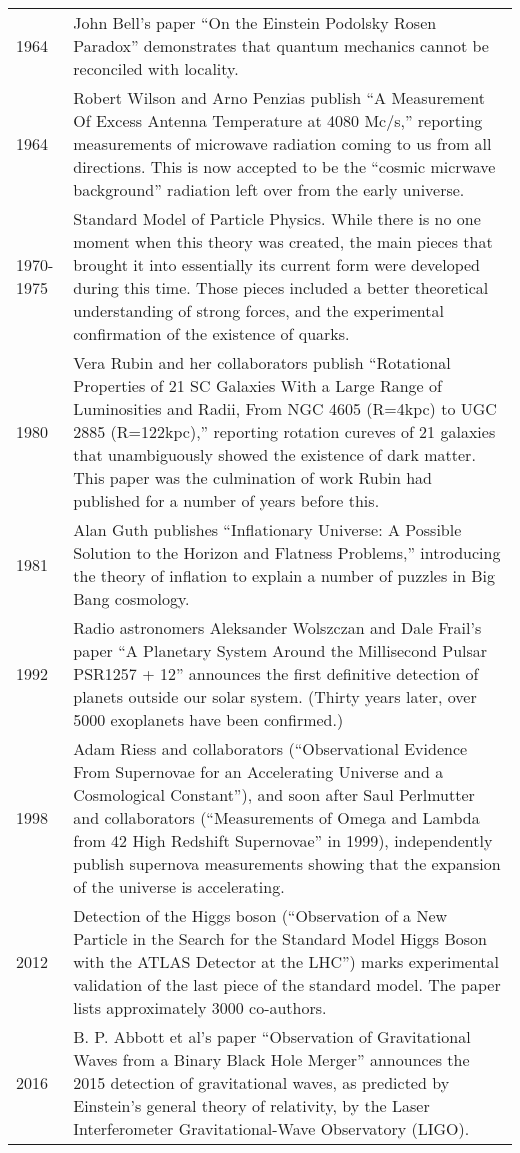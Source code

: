 \documentclass[../main.tex]{subfiles}
\begin{document}
\begin{center}
\begin{longtable}{p{}  p{}}
1964&John Bell's paper “On the Einstein Podolsky Rosen Paradox” demonstrates that quantum mechanics cannot be reconciled with locality.\\
1964&Robert Wilson and Arno Penzias publish “A Measurement Of Excess Antenna Temperature at 4080 Mc/s,” reporting measurements of microwave radiation coming to us from all directions. This is now accepted to be the “cosmic micrwave background” radiation left over from the early universe.\\
1970-1975&Standard Model of Particle Physics. While there is no one moment when this theory was created, the main pieces that brought it into essentially its current form were developed during this time. Those pieces included a better theoretical understanding of strong forces, and the experimental confirmation of the existence of quarks.\\
1980&Vera Rubin and her collaborators publish “Rotational Properties of 21 SC Galaxies With a Large Range of Luminosities and Radii, From NGC
4605 (R=4kpc) to UGC 2885 (R=122kpc),” reporting rotation cureves of 21 galaxies that unambiguously showed the existence of dark matter. This paper was the culmination of work Rubin had published for a number of years before this.\\
1981&Alan Guth publishes “Inflationary Universe: A Possible Solution to the Horizon and Flatness Problems,” introducing the theory of inflation to explain a number of puzzles in Big Bang cosmology.\\
1992&Radio astronomers Aleksander Wolszczan and Dale Frail's paper “A Planetary System Around the Millisecond Pulsar PSR1257 + 12” announces the first definitive detection of planets outside our solar system. (Thirty years later, over 5000 exoplanets have been confirmed.) \\
1998&Adam Riess and collaborators (“Observational Evidence From Supernovae for an Accelerating Universe and a Cosmological Constant”), and soon after Saul Perlmutter and collaborators (“Measurements of Omega
and Lambda from 42 High Redshift Supernovae” in 1999), independently publish supernova measurements showing that the expansion of the universe is accelerating.\\
2012&Detection of the Higgs boson (“Observation of a New Particle in the Search for the Standard Model Higgs Boson with the ATLAS Detector at the LHC”) marks experimental validation of the last piece of the standard model. The paper lists approximately 3000 co-authors.\\
2016&B. P. Abbott et al's paper “Observation of Gravitational Waves from a Binary Black Hole Merger” announces the 2015  detection of gravitational waves, as predicted by Einstein's general theory of relativity, by the Laser Interferometer Gravitational-Wave Observatory (LIGO).\\

\end{longtable}
\end{center}
\end{document}
